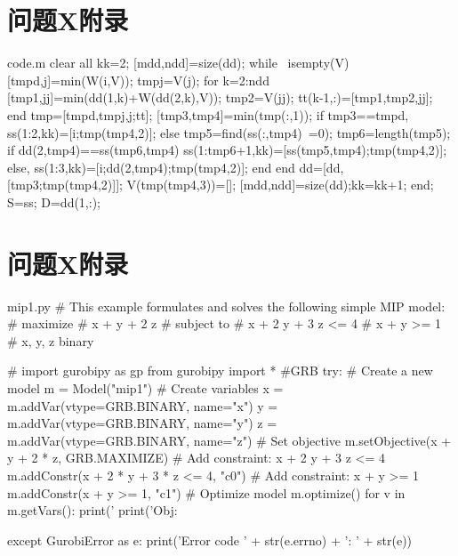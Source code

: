 \documentclass[bwprint]{gmcmthesis}
\begin{document}
\clearpage
\begin{appendices}

\clearpage
\section{问题X附录} %
\vspace{-2ex}
\begin{Matlab}{code.m}
clear all
kk=2;
[mdd,ndd]=size(dd);
while ~isempty(V)
    [tmpd,j]=min(W(i,V));
    tmpj=V(j);
    for k=2:ndd
        [tmp1,jj]=min(dd(1,k)+W(dd(2,k),V));
        tmp2=V(jj);
        tt(k-1,:)=[tmp1,tmp2,jj];
    end
    tmp=[tmpd,tmpj,j;tt];
    [tmp3,tmp4]=min(tmp(:,1));
    if tmp3==tmpd,
        ss(1:2,kk)=[i;tmp(tmp4,2)];
    else
        tmp5=find(ss(:,tmp4)~=0);
        tmp6=length(tmp5);
        if dd(2,tmp4)==ss(tmp6,tmp4)
            ss(1:tmp6+1,kk)=[ss(tmp5,tmp4);tmp(tmp4,2)];
        else, ss(1:3,kk)=[i;dd(2,tmp4);tmp(tmp4,2)];
        end
    end
    dd=[dd,[tmp3;tmp(tmp4,2)]];
    V(tmp(tmp4,3))=[];
    [mdd,ndd]=size(dd);kk=kk+1;
end;
S=ss; D=dd(1,:);
\end{Matlab}
\vspace{2ex}

\clearpage
\section{问题X附录} %
\vspace{-2ex}
\begin{Python}{mip1.py}
# This example formulates and solves the following simple MIP model:
#  maximize
#        x +   y + 2 z
#  subject to
#        x + 2 y + 3 z <= 4
#        x +   y       >= 1
#        x, y, z binary

# import gurobipy as gp
from gurobipy import * #GRB
try:
    # Create a new model
    m = Model("mip1")
    # Create variables
    x = m.addVar(vtype=GRB.BINARY, name="x")
    y = m.addVar(vtype=GRB.BINARY, name="y")
    z = m.addVar(vtype=GRB.BINARY, name="z")
    # Set objective
    m.setObjective(x + y + 2 * z, GRB.MAXIMIZE)
    # Add constraint: x + 2 y + 3 z <= 4
    m.addConstr(x + 2 * y + 3 * z <= 4, "c0")
    # Add constraint: x + y >= 1
    m.addConstr(x + y >= 1, "c1")
    # Optimize model
    m.optimize()
    for v in m.getVars():
        print('%
    print('Obj: %

except GurobiError as e:
    print('Error code ' + str(e.errno) + ': ' + str(e))


\end{Python}
\end{appendices}
\end{document}
